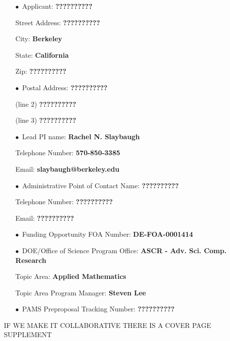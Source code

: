 \documentclass[12pt]{article}
\begin{document}
\begin{itemize}[noitemsep,topsep=0pt,parsep=-2pt,partopsep=20pt,labelwidth=7.5cm,align=left,
itemindent=7.5cm]
\item[$\bullet$\, Applicant:] 					{\bf ??????????}
\item[\quad Street Address:] 					{\bf ??????????}
\item[\quad City:] 									{\bf Berkeley}
\item[\quad State:] 								{\bf California}
\item[\quad Zip:] 									{\bf ??????????}\vspace{12pt}
\item[$\bullet$\, Postal Address:] 			{\bf ??????????}
\item[\quad (line 2)] 								{\bf ??????????}
\item[\quad (line 3)] 								{\bf ??????????}\vspace{12pt}
\item[$\bullet$\, Lead PI name:] 			{\bf Rachel N. Slaybaugh}
\item[\quad Telephone Number:]			{\bf 570-850-3385}
\item[\quad Email:]									{\bf slaybaugh@berkeley.edu}\vspace{12pt}
\item[$\bullet$\, Administrative Point of Contact Name:] {\bf ??????????}
\item[\quad Telephone Number:]			{\bf ??????????}
\item[\quad Email:]									{\bf ??????????}\vspace{12pt}
\item[$\bullet$\, Funding Opportunity FOA Number:] {\bf DE-FOA-0001414}\vspace{8pt}
\item[$\bullet$\, DOE/Office of Science Program Office:] {\bf ASCR - Adv. Sci.
 Comp. Research}
\item[\quad Topic Area:]							{\bf Applied Mathematics}
\item[\quad Topic Area Program Manager:] {\bf Steven Lee}\vspace{12pt}
\item[$\bullet$\, PAMS Preproposal Tracking Number:] {\bf ??????????}
\end{itemize}

\pagebreak

IF WE MAKE IT COLLABORATIVE THERE IS A COVER PAGE SUPPLEMENT

\pagebreak
\end{document}
